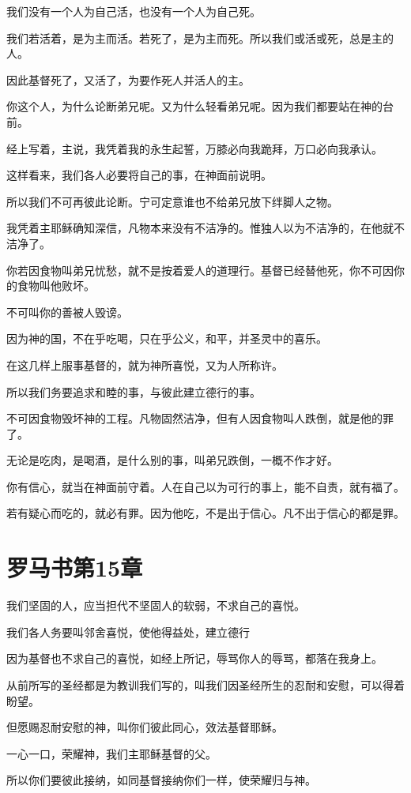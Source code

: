 \documentclass[12pt,oneside]{book}
\begin{document}
我们没有一个人为自己活，也没有一个人为自己死。

我们若活着，是为主而活。若死了，是为主而死。所以我们或活或死，总是主的人。

因此基督死了，又活了，为要作死人并活人的主。

你这个人，为什么论断弟兄呢。又为什么轻看弟兄呢。因为我们都要站在神的台前。

经上写着，主说，我凭着我的永生起誓，万膝必向我跪拜，万口必向我承认。

这样看来，我们各人必要将自己的事，在神面前说明。

所以我们不可再彼此论断。宁可定意谁也不给弟兄放下绊脚人之物。

我凭着主耶稣确知深信，凡物本来没有不洁净的。惟独人以为不洁净的，在他就不洁净了。

你若因食物叫弟兄忧愁，就不是按着爱人的道理行。基督已经替他死，你不可因你的食物叫他败坏。

不可叫你的善被人毁谤。

因为神的国，不在乎吃喝，只在乎公义，和平，并圣灵中的喜乐。

在这几样上服事基督的，就为神所喜悦，又为人所称许。

所以我们务要追求和睦的事，与彼此建立德行的事。

不可因食物毁坏神的工程。凡物固然洁净，但有人因食物叫人跌倒，就是他的罪了。

无论是吃肉，是喝酒，是什么别的事，叫弟兄跌倒，一概不作才好。

你有信心，就当在神面前守着。人在自己以为可行的事上，能不自责，就有福了。

若有疑心而吃的，就必有罪。因为他吃，不是出于信心。凡不出于信心的都是罪。

\chapter{罗马书第15章}
我们坚固的人，应当担代不坚固人的软弱，不求自己的喜悦。

我们各人务要叫邻舍喜悦，使他得益处，建立德行

因为基督也不求自己的喜悦，如经上所记，辱骂你人的辱骂，都落在我身上。

从前所写的圣经都是为教训我们写的，叫我们因圣经所生的忍耐和安慰，可以得着盼望。

但愿赐忍耐安慰的神，叫你们彼此同心，效法基督耶稣。

一心一口，荣耀神，我们主耶稣基督的父。

所以你们要彼此接纳，如同基督接纳你们一样，使荣耀归与神。
\end{document}
